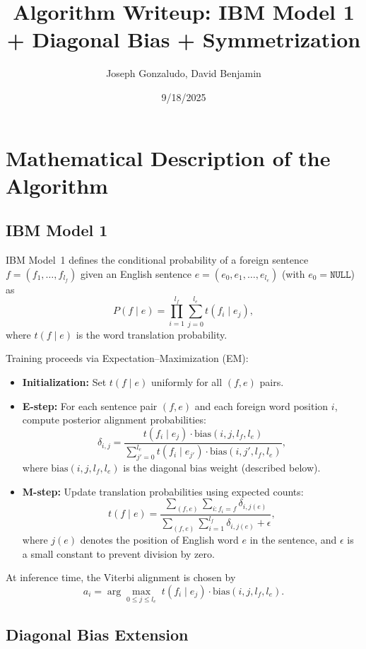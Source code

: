 \documentclass[11pt]{article}
\title{Algorithm Writeup: IBM Model 1 + Diagonal Bias + Symmetrization}
\author{Joseph Gonzaludo, David Benjamin}
\date{9/18/2025}
\begin{document}
\maketitle

\section{Mathematical Description of the Algorithm}

\subsection{IBM Model 1}

IBM Model~1 defines the conditional probability of a foreign sentence 
$f = (f_1, \dots, f_{l_f})$ given an English sentence 
$e = (e_0, e_1, \dots, e_{l_e})$ (with $e_0 = \texttt{NULL}$) as
\[
P(f \mid e) = \prod_{i=1}^{l_f} \sum_{j=0}^{l_e} t(f_i \mid e_j),
\]
where $t(f \mid e)$ is the word translation probability.  

Training proceeds via Expectation--Maximization (EM):

\begin{itemize}
    \item \textbf{Initialization:} Set $t(f \mid e)$ uniformly for all $(f,e)$ pairs.
    \item \textbf{E-step:} For each sentence pair $(f,e)$ and each foreign word position $i$, compute posterior alignment probabilities:
    \[
    \delta_{i,j} = \frac{t(f_i \mid e_j) \cdot \text{bias}(i,j,l_f,l_e)}{\sum_{j'=0}^{l_e} t(f_i \mid e_{j'}) \cdot \text{bias}(i,j',l_f,l_e)},
    \]
    where $\text{bias}(i,j,l_f,l_e)$ is the diagonal bias weight (described below).
    \item \textbf{M-step:} Update translation probabilities using expected counts:
    \[
    t(f \mid e) = \frac{\sum_{(f,e)} \sum_{i: f_i=f} \delta_{i,j(e)}}{\sum_{(f,e)} \sum_{i=1}^{l_f} \delta_{i,j(e)} + \epsilon},
    \]
    where $j(e)$ denotes the position of English word $e$ in the sentence, and $\epsilon$ is a small constant to prevent division by zero.
\end{itemize}

At inference time, the Viterbi alignment is chosen by
\[
a_i = \arg\max_{0 \le j \le l_e} \; t(f_i \mid e_j) \cdot \text{bias}(i,j,l_f,l_e).
\]

\subsection{Diagonal Bias Extension}
\end{document}
